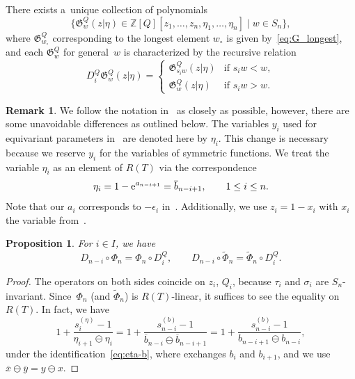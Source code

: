 \documentclass[pdftex]{sigma}
\numberwithin{equation}{section}
\newcommand{\Gro}[1]{\mathfrak{G}^Q_{#1}}
\newcommand{\Rep}{{R(T)}}
\newcommand{\Z}{\mathbb{Z}}
\newtheorem{Proposition}[Theorem]{Proposition}
\theoremstyle{definition}
\newtheorem{Remark}[Theorem]{Remark}
\begin{document}
There exists a~unique collection of polynomials
\[
\bigl\{\Gro{w}(z|\eta)
\in \Z[Q][z_1,\dots,z_{n},\eta_1,\dots,\eta_{n}]
 \mid w\in S_n\bigr\},\]
where $\mathfrak{G}_{w_\circ}^Q$ corresponding to the longest element $w_\circ$ is given by~\eqref{eq:G_longest}, and each $\mathfrak{G}_{w}^Q$ for general~$w$ is characterized by the recursive relation
\begin{equation}
 \label{eq:Di_Gr}
D_i^Q\Gro{w}(z|\eta)=\begin{cases}
\Gro{s_iw}(z|\eta) & \text{if $s_i w<w$},\\
\Gro{w}(z|\eta) & \text{if $s_i w>w$}.
\end{cases}
\end{equation}
\begin{Remark}\label{rem:e_vs_eta}
We follow the notation in~\cite{MNS2} as closely as possible, however, there are some
unavoidable differences as outlined below.
The variables $y_i$ used for equivariant parameters in~\cite{MNS2} are denoted here by $\eta_i$.
This change is necessary because we reserve $y_i$ for the variables of symmetric functions.
We treat the variable $\eta_i$ as
an element of $\Rep$ via the correspondence
\begin{equation}
\eta_i=1-{\rm e}^{a_{n-i+1}}=\overline{b}_{n-i+1},\qquad1\le i\le n.
\label{eq:eta-b}
\end{equation}
Note that our $a_i$ corresponds to $-\epsilon_i$ in~\cite{MNS2}.
Additionally, we use $z_i=1-x_i$ with $x_i$
the variable from~\cite{MNS2}.


\end{Remark}

\begin{Proposition}For $i\in I$, we have
 \begin{equation}
D_{n-i}\circ \Phi_n=\Phi_n \circ D_i^Q,\qquad
D_{n-i}\circ \tilde{\Phi}_n=\tilde{\Phi}_n \circ D_i^Q.
\label{eq:D_and_Phi}
\end{equation}
\end{Proposition}
\begin{proof}
The operators on both sides
coincide on $z_i$, $Q_i$,
because $\tau_i$ and $\sigma_i$ are $S_n$-invariant. Since~$\Phi_n$ \big(and $\tilde{\Phi}_n$\big) is $\Rep$-linear,
it suffices to see the equality
on $\Rep$. In fact, we have
\begin{equation*}
1+\frac{s_i^{(\eta)}-1}{\eta_{i+1}\ominus \eta_{i}}
=1+
\frac{s_{n-i}^{(b)}-1}{\overline{b}_{n-i}\ominus \overline{b}_{n-i+1}}
=1+
\frac{s_{n-i}^{(b)}-1}{b_{n-i+1}\ominus b_{n-i}},
\end{equation*}
under the
identification~\eqref{eq:eta-b},
where  exchanges $b_i$
and $b_{i+1}$,
and we use $\overline{x}\ominus \overline{y}=y\ominus x$.
\end{proof}
\end{document}
